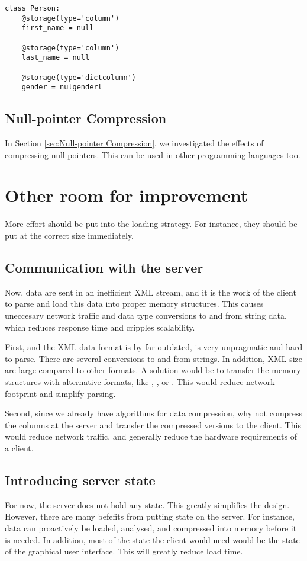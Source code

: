 \begin{lstlisting}
class Person:
    @storage(type='column')
    first_name = null

    @storage(type='column')
    last_name = null

    @storage(type='dictcolumn')
    gender = nulgenderl
\end{lstlisting}


\subsection{Null-pointer Compression}
\label{sub:Null-pointer Compression}
In Section \ref{sec:Null-pointer Compression}, we investigated the effects of compressing null pointers. This can be used in other programming languages too.

\section{Other room for improvement}
\label{sec: Other room for improvement}
More effort should be put into the loading strategy. For instance, they should be put at the correct size immediately.

\subsection{Communication with the server}
\label{sub:Compressing data at the server}
Now, data are sent in an inefficient XML stream, and it is the work of the client to parse and load this data into proper memory structures. This causes uneccesary network traffic and data type conversions to and from string data, which reduces response time and cripples scalability.

First, and the XML data format is by far outdated, is very unpragmatic and hard to parse. There are several conversions to and from strings. In addition, XML size are large compared to other formats. A solution would be to transfer the memory structures with alternative formats, like , , or . This would reduce network footprint and simplify parsing. 

Second, since we already have algorithms for data compression, why not compress the columns at the server and transfer the compressed versions to the client. This would reduce network traffic, and generally reduce the hardware requirements of a client.

\subsection{Introducing server state}
\label{sub:Introducing server state}
For now, the server does not hold any state. This greatly simplifies the design. However, there are many befefits from putting state on the server. For instance, data can proactively be loaded, analysed, and compressed into memory before it is needed. In addition, most of the state the client would need would be the state of the graphical user interface. This will greatly reduce load time. 

